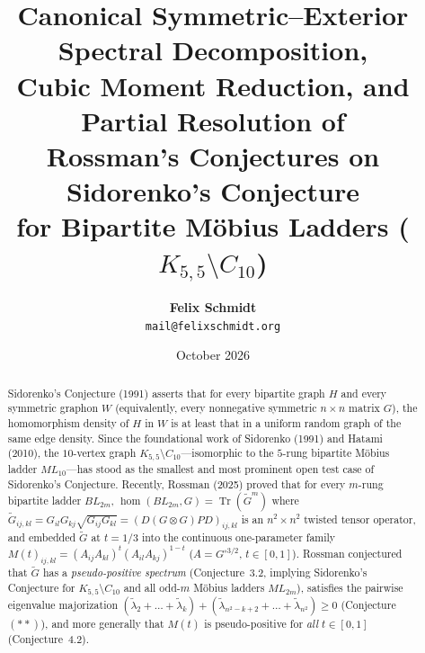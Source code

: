 \documentclass[11pt,a4paper]{article}
\title{\textbf{Canonical Symmetric--Exterior Spectral Decomposition,\\
Cubic Moment Reduction, and Partial Resolution of\\
Rossman's Conjectures on Sidorenko's Conjecture\\
for Bipartite M\"obius Ladders ($K_{5,5} \setminus C_{10}$)}}
\author{\textbf{Felix Schmidt}\\
\texttt{mail@felixschmidt.org}}
\date{October 2026}
\theoremstyle{plain}
\theoremstyle{definition}
\theoremstyle{remark}
\DeclareMathOperator{\Tr}{Tr}
\DeclareMathOperator{\homop}{hom}
\begin{document}
\maketitle

\begin{abstract}
Sidorenko's Conjecture (1991) asserts that for every bipartite graph $H$ and every symmetric graphon $W$ (equivalently, every nonnegative symmetric $n \times n$ matrix $G$), the homomorphism density of $H$ in $W$ is at least that in a uniform random graph of the same edge density. Since the foundational work of Sidorenko (1991) and Hatami (2010), the $10$-vertex graph $K_{5,5} \setminus C_{10}$---isomorphic to the $5$-rung bipartite M\"obius ladder $ML_{10}$---has stood as the smallest and most prominent open test case of Sidorenko's Conjecture. Recently, Rossman (2025) proved that for every $m$-rung bipartite ladder $BL_{2m}$, $\homop(BL_{2m}, G) = \Tr(\widetilde{G}^m)$ where $\widetilde{G}_{ij,kl} = G_{il}G_{kj}\sqrt{G_{ij}G_{kl}} = (D(G \otimes G)PD)_{ij,kl}$ is an $n^2 \times n^2$ twisted tensor operator, and embedded $\widetilde{G}$ at $t = 1/3$ into the continuous one-parameter family $M(t)_{ij,kl} = (A_{ij}A_{kl})^t(A_{il}A_{kj})^{1-t}$ ($A = G^{\circ 3/2}$, $t \in [0,1]$). Rossman conjectured that $\widetilde{G}$ has a \emph{pseudo-positive spectrum} (Conjecture~3.2, implying Sidorenko's Conjecture for $K_{5,5} \setminus C_{10}$ and all odd-$m$ M\"obius ladders $ML_{2m}$), satisfies the pairwise eigenvalue majorization $(\widetilde{\lambda}_2 + \dots + \widetilde{\lambda}_k) + (\widetilde{\lambda}_{n^2-k+2} + \dots + \widetilde{\lambda}_{n^2}) \ge 0$ (Conjecture~$(**)$), and more generally that $M(t)$ is pseudo-positive for \emph{all} $t \in [0,1]$ (Conjecture~4.2).


\end{abstract}
\end{document}
